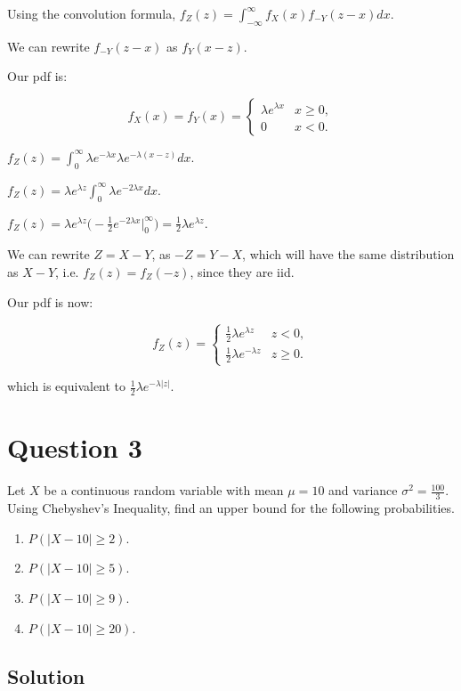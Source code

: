 \documentclass[]{article}
\begin{document}
Using the convolution formula,
\(f_Z(z) = \int_{-\infty}^{\infty}f_X(x)f_{-Y}(z - x) dx\).

We can rewrite \(f_{-Y}(z - x)\) as \(f_Y(x - z)\).

Our pdf is:

\[
f_X(x) = f_Y(x) = 
\begin{cases}
\lambda e^{\lambda x} & x \geq 0,\\
0                     & x < 0.
\end{cases}
\]

\(f_Z(z) = \int_{0}^{\infty}\lambda e^{-\lambda x}\lambda e^{-\lambda(x - z)} dx\).

\(f_Z(z) = \lambda e^{\lambda z}\int_{0}^{\infty}\lambda e^{-2\lambda x} dx\).

\(f_Z(z) = \lambda e^{\lambda z}\Big(-\frac{1}{2}e^{-2\lambda x}\Big|_{0}^{\infty}\Big) = \frac{1}{2}\lambda e^{\lambda z}\).

We can rewrite \(Z = X - Y\), as \(-Z = Y - X\), which will have the
same distribution as \(X - Y\), i.e. \(f_Z(z) = f_Z(-z)\), since they
are iid.

Our pdf is now:

\[
f_Z(z) = 
\begin{cases}
\frac{1}{2}\lambda e^{\lambda z}  & z < 0,\\
\frac{1}{2}\lambda e^{-\lambda z} & z \geq 0.
\end{cases}
\]

which is equivalent to \(\frac{1}{2}\lambda e^{-\lambda|z|}\).

\section{Question 3}\label{question-3}

Let \(X\) be a continuous random variable with mean \(\mu = 10\) and
variance \(\sigma^2 = \frac{100}{3}\). Using Chebyshev's Inequality,
find an upper bound for the following probabilities.

\begin{enumerate}
\def\labelenumi{\alph{enumi})}
\item
  \(P(|X - 10| \geq 2)\).
\item
  \(P(|X - 10| \geq 5)\).
\item
  \(P(|X - 10| \geq 9)\).
\item
  \(P(|X - 10| \geq 20)\).
\end{enumerate}

\subsection{Solution}\label{solution-2}
\end{document}
